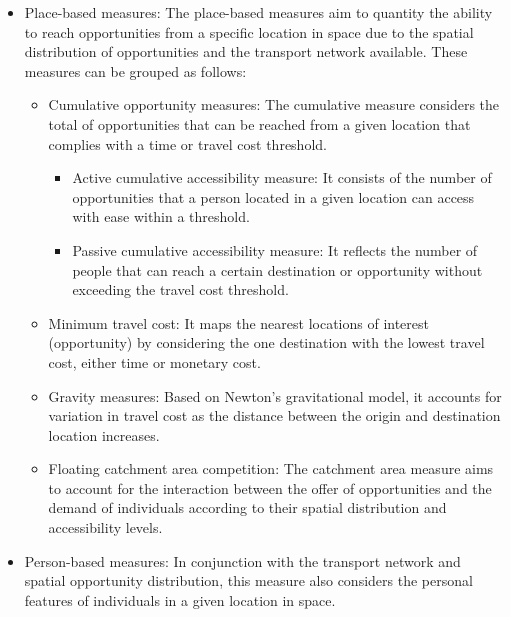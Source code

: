 \documentclass[12pt, a4paper]{report}
\begin{document}
\begin{itemize}
  \item Place-based measures: The place-based measures aim to quantity the ability to reach opportunities from a specific location in space due to the spatial distribution of opportunities and the transport network available. These measures can be grouped as follows:
    \begin{itemize}
        \item Cumulative opportunity measures: The cumulative measure considers the total of opportunities that can be reached from a given location that complies with a time or travel cost threshold.
            \begin{itemize}
                \item Active cumulative accessibility measure: It consists of the number of opportunities that a person located in a given location can access with ease within a threshold. 
                \item Passive cumulative accessibility measure: It reflects the number of people that can reach a certain destination or opportunity without exceeding the travel cost threshold.
            \end{itemize}
        \item Minimum travel cost: It maps the nearest locations of interest (opportunity) by considering the one destination with the lowest travel cost, either time or monetary cost.
        \item Gravity measures: Based on Newton's gravitational model, it accounts for variation in travel cost as the distance between the origin and destination location increases.
        \item Floating catchment area competition: The catchment area measure aims to account for the interaction between the offer of opportunities and the demand of individuals according to their spatial distribution and accessibility levels.
        
    \end{itemize}
  \item Person-based measures: In conjunction with the transport network and spatial opportunity distribution, this measure also considers the personal features of individuals in a given location in space.
\end{itemize}




\end{document}
